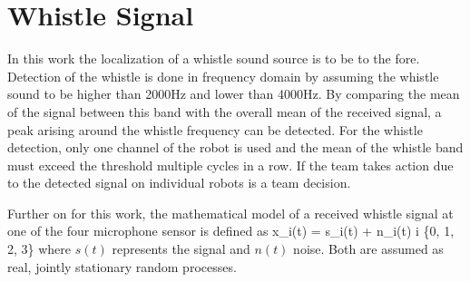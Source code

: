 \section{Whistle Signal}
\label{sec:02_whistleSignal}

In this work the localization of a whistle sound source is to be to the fore.
Detection of the whistle is done in frequency domain by assuming the whistle
sound to be higher than 2000Hz and lower than 4000Hz.
By comparing the mean of the signal between this band with the overall mean of the
received signal, a peak arising around the whistle frequency can be detected.
For the whistle detection, only one channel of the robot is used and the
mean of the whistle band must exceed the threshold multiple cycles in a row.
If the team takes action due to the detected signal on individual robots is a team decision.

Further on for this work, the mathematical model of a received whistle
signal at one of the four microphone sensor is defined as
\be
x_i(t) = s_i(t) + n_i(t)  i \in \{0, 1, 2, 3\}
\label{eq:02_whistleSignal}
\ee
where $s(t)$ represents the signal and $n(t)$ noise.
Both are assumed as real, jointly stationary random processes.